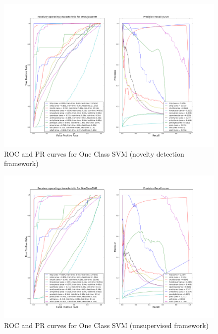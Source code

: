 \begin{figure}[!ht]
  \centering
  \caption{ROC and PR curves for One Class SVM (novelty detection framework)}
  \label{evaluation:fig:ocsvm_roc_pr}
  \includegraphics[trim=175 80 175 98, clip, width=\linewidth]{fig_source/evaluation_fig/bench_ocsvm_roc_pr_supervised_factorized.png}
\end{figure}

\begin{figure}[!ht]
  \centering
  \caption{ROC and PR curves for One Class SVM (unsupervised framework)}
  \label{evaluation:fig:ocsvm_roc_pr_unsupervised}
  \includegraphics[trim=175 80 175 98, clip, width=\linewidth]{fig_source/evaluation_fig/bench_ocsvm_roc_pr_unsupervised_factorized.png}
\end{figure}

